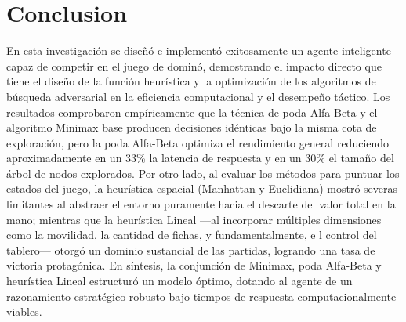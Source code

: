 \documentclass[journal,onecolumn]{IEEEtran}
\begin{document}
\section{Conclusion}
En esta investigación se diseñó e implementó exitosamente un agente inteligente capaz de competir en el juego de dominó, demostrando el impacto directo que tiene el diseño de la función heurística
y la optimización de los algoritmos de búsqueda adversarial en la eficiencia computacional y el desempeño táctico. Los resultados comprobaron empíricamente que la técnica de poda Alfa-Beta y el algoritmo 
Minimax base producen decisiones idénticas bajo la misma cota de exploración, pero la poda Alfa-Beta optimiza el rendimiento general reduciendo aproximadamente en un 33\% la latencia de respuesta y 
en un 30\% el tamaño del árbol de nodos explorados. Por otro lado, al evaluar los métodos para puntuar los estados del juego, la heurística espacial (Manhattan y Euclidiana) mostró severas limitantes 
al abstraer el entorno puramente hacia el descarte del valor total en la mano; mientras que la heurística Lineal —al incorporar múltiples dimensiones como la movilidad, la cantidad de fichas, y fundamentalmente, e
l control del tablero— otorgó un dominio sustancial de las partidas, logrando una tasa de victoria protagónica. En síntesis, la conjunción de Minimax, poda Alfa-Beta y heurística Lineal estructuró un modelo óptimo, 
dotando al agente de un razonamiento estratégico robusto bajo tiempos de respuesta computacionalmente viables.
\end{document}
